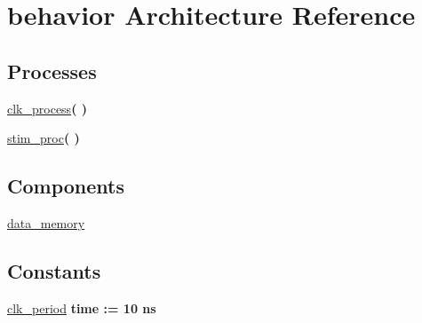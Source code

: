\hypertarget{classdata__memory__tb_1_1behavior}{\section{behavior \-Architecture \-Reference}
\label{classdata__memory__tb_1_1behavior}
}
\*
\*
\subsection*{\-Processes}
 \begin{DoxyCompactItemize}
\item 
\hypertarget{classdata__memory__tb_1_1behavior_ac5bb218131b813f7908ec89476b31fca}{\hyperlink{classdata__memory__tb_1_1behavior_ac5bb218131b813f7908ec89476b31fca}{clk\-\_\-process}{\bfseries  (  )}}\label{classdata__memory__tb_1_1behavior_ac5bb218131b813f7908ec89476b31fca}

\item 
\hypertarget{classdata__memory__tb_1_1behavior_ad2efa6785cff833c341e27596b21aeb5}{\hyperlink{classdata__memory__tb_1_1behavior_ad2efa6785cff833c341e27596b21aeb5}{stim\-\_\-proc}{\bfseries  (  )}}\label{classdata__memory__tb_1_1behavior_ad2efa6785cff833c341e27596b21aeb5}

\end{DoxyCompactItemize}
\subsection*{\-Components}
 \begin{DoxyCompactItemize}
\item 
\hypertarget{classdata__memory__tb_1_1behavior_a422c295df4ca366bef414f65f01fd1b2}{\hyperlink{classdata__memory__tb_1_1behavior_a422c295df4ca366bef414f65f01fd1b2}{data\-\_\-memory}  {\bfseries }  }\label{classdata__memory__tb_1_1behavior_a422c295df4ca366bef414f65f01fd1b2}

\end{DoxyCompactItemize}
\subsection*{\-Constants}
 \begin{DoxyCompactItemize}
\item 
\hypertarget{classdata__memory__tb_1_1behavior_a25815afa4d614fdd5f49e43c04e1a946}{\hyperlink{classdata__memory__tb_1_1behavior_a25815afa4d614fdd5f49e43c04e1a946}{clk\-\_\-period} {\bfseries time  \-:=  10  ns } }\label{classdata__memory__tb_1_1behavior_a25815afa4d614fdd5f49e43c04e1a946}

\end{DoxyCompactItemize}

